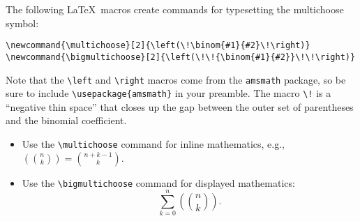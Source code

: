 \documentclass[12pt]{article}
\newcommand{\multichoose}[2]{\left(\!\binom{#1}{#2}\!\right)}
\newcommand{\bigmultichoose}[2]{\left(\!\!{\binom{#1}{#2}}\!\!\right)}
\begin{document}
The following \LaTeX\ macros create commands for typesetting
the multichoose symbol:
\begin{verbatim}
\newcommand{\multichoose}[2]{\left(\!\binom{#1}{#2}\!\right)}
\newcommand{\bigmultichoose}[2]{\left(\!\!{\binom{#1}{#2}}\!\!\right)}
\end{verbatim}
Note that the \verb|\left| and \verb|\right| macros come from the
\verb|amsmath| package, so be sure to include
\verb|\usepackage{amsmath}| in your preamble. The macro \verb|\!| is a
``negative thin space'' that closes up the gap between the outer set
of parentheses and the binomial coefficient.

\begin{itemize}
\item Use the \verb|\multichoose| command for inline mathematics,
  e.g., $\multichoose{n}{k} = \binom{n+k-1}{k}$.

\item Use the \verb|\bigmultichoose| command for displayed
  mathematics:
  \[
  \sum_{k=0}^n \bigmultichoose{n}{k} .
  \]
\end{itemize}
\end{document}
